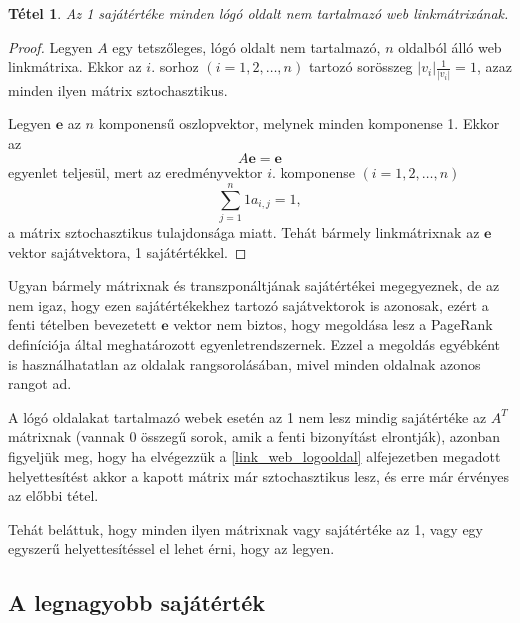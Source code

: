 \documentclass[12pt,a4paper]{article}
\newcommand{\be}{\mathbf{e}}
\newtheorem{tetel}{Tétel}
\begin{document}
\begin{tetel}
	Az 1 sajátértéke minden lógó oldalt nem tartalmazó web linkmátrixának.
\end{tetel}
\begin{proof}
	Legyen $A$ egy tetszőleges, lógó oldalt nem tartalmazó, $n$ oldalból álló web linkmátrixa. Ekkor az $i$. sorhoz $(i = 1,2,\ldots,n)$ tartozó sorösszeg $ |v_i| \frac{1}{|v_i|} = 1 $, azaz minden ilyen mátrix sztochasztikus.
	
	Legyen $\be$ az $n$ komponensű oszlopvektor, melynek minden komponense 1. Ekkor az
	\[ A \be = \be \] 
	egyenlet teljesül, mert az eredményvektor $i$. komponense $(i = 1,2,\ldots,n)$
	\[ \sum_{j=1}^{n}{1 a_{i,j} } = 1, \] 
	a mátrix sztochasztikus tulajdonsága miatt. Tehát bármely linkmátrixnak az $\be$ vektor sajátvektora, 1 sajátértékkel.
\end{proof}
\vspace{0.5cm}

Ugyan bármely mátrixnak és transzponáltjának sajátértékei megegyeznek, de az nem igaz, hogy ezen sajátértékekhez tartozó sajátvektorok is azonosak, ezért a fenti tételben bevezetett $\be$ vektor nem biztos, hogy megoldása lesz a PageRank definíciója által meghatározott egyenletrendszernek. Ezzel a megoldás egyébként is használhatatlan az oldalak rangsorolásában, mivel minden oldalnak azonos rangot ad.

A lógó oldalakat tartalmazó webek esetén az 1 nem lesz mindig sajátértéke az $A^T$ mátrixnak (vannak 0 összegű sorok, amik a fenti bizonyítást elrontják), azonban figyeljük meg, hogy ha elvégezzük a \ref{link_web_logooldal} alfejezetben megadott helyettesítést akkor a kapott mátrix már sztochasztikus lesz, és erre már érvényes az előbbi tétel.

Tehát beláttuk, hogy minden ilyen mátrixnak vagy sajátértéke az 1, vagy egy egyszerű helyettesítéssel el lehet érni, hogy az legyen. 

\subsection{A legnagyobb sajátérték}\label{legnagyobb_sajatertek}
\end{document}
